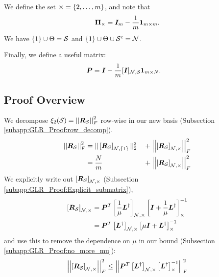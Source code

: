 We define the set $\mathcal{\Theta} = \{2, \ldots, m\}$, and note that
\begin{equation}
     \proj{\Theta} = \matr{I}_{m} - \frac{1}{m}\matr{1}_{m \times m} .
\end{equation}
We have $\{1\} \cup \Theta = \mathcal{S}$ and $ \{1\} \cup \Theta \cup \mathcal{S}^{c} = \mathcal{N}$. 

Finally, we define a useful matrix:
\begin{align}
    \matr{P} &= \matr{I} - \frac{1}{m}\matrsub[N,S]{I}\matr{1}_{m \times N}.
\end{align}
\subsection{Proof Overview}
We decompose $\xi_{2}(\mathcal{S}) = \left\lvert\left\lvert\bm{R}_{\mathcal{S}}\right\rvert\right\rvert^{2}_{F}$ row-wise in our new basis (Subsection \ref{subapp:GLR_Proof:row_decomp}).
\begin{align}
 \sqfrob{\matr{R}_{\set{S}}} &= ||\msubgen[\set{N}, \{1\}]{\matr{R}_{\set{S}}}||^{2}_{2} &&+ \sqfrob{\msub[N, \Theta]{\matr{R}_{\set{S}}}} \\
    &= \frac{N}{m} &&+ \sqfrob{\msub[N, \Theta]{\matr{R}_{\set{S}}}}
\end{align}
We explicitly write out $\msub[N,\Theta]{\matr{R}_{\set{S}}}$ (Subsection \ref{subapp:GLR_Proof:Explicit_submatrix}),
\begin{align}
    \msub[N,\Theta]{\matr{R}_{\set{S}}} &= \matr{P}^{T}\msub[N,\Theta]{\frac{1}{\mu}\matr{L}^{\dagger}}\msub[\Theta]{\matr{I} + \frac{1}{\mu}\matr{L}^{\dagger}}^{-1} \\
    &= \matr{P}^{T}\msub[N,\Theta]{\matr{L}^{\dagger}}\msub[\Theta]{\mu \matr{I} + \matr{L}^{\dagger}}^{-1}
\end{align}
and use this to remove the dependence on $\mu$ in our bound (Subsection \ref{subapp:GLR_Proof:no_more_mu}):
\begin{align}
     \sqfrob{\msub[N,\Theta]{\matr{R}_{\set{S}}}} \leq \sqfrob{\matr{P}^{T}\msub[N,\Theta]{\matr{L}^{\dagger}}\msub[\Theta]{\matr{L}^{\dagger}}^{-1}} \label{eq:GLR_Proof_intro:muless_ineq}
\end{align}

